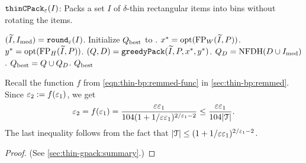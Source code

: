 \begin{algorithm}[htb]
\caption{$\operatorname{\mathtt{thinCPack}}_{\varepsilon}(I)$: Packs a set $I$ of $\delta$-thin rectangular items
into bins without rotating the items.}
\label{algo:thinCPack}
\begin{algorithmic}[1]
\State $(\widetilde{I}, I_{\mathrm{med}}) = \operatorname{\mathtt{round}}_{\varepsilon}(I)$.
\State Initialize $Q_{\mathrm{best}}$ to \Null.
    \State $x^* = \operatorname{opt}(\operatorname{FP}_W(\widetilde{I}, P))$.
    \State $y^* = \operatorname{opt}(\operatorname{FP}_H(\widetilde{I}, P))$.
        \State $(Q, D) = \operatorname{\mathtt{greedyPack}}(\widetilde{I}, P, x^*, y^*)$.
        \State $Q_D = \operatorname{NFDH}(D \cup I_{\mathrm{med}})$.
            \State $Q_{\mathrm{best}} = Q \cup Q_D$.
        \EndIf
    \EndIf
\EndFor
\State \Return $Q_{\mathrm{best}}$
\end{algorithmic}
\end{algorithm}

Recall the function $f$ from \cref{eqn:thin-bp:remmed-func} in \cref{sec:thin-bp:remmed}.
Since $\varepsilon_2 := f(\varepsilon_1)$, we get
\begin{equation}
\label{eqn:epsSmall}
\varepsilon_2 = f(\varepsilon_1)
= \frac{\varepsilon\varepsilon_1}{104(1+1/\varepsilon\varepsilon_1)^{2/\varepsilon_1-2}}
\le \frac{\varepsilon\varepsilon_1}{104|\mathcal{T}|}.
\end{equation}
The last inequality follows from the fact that
$|\mathcal{T}| \le (1+1/\varepsilon\varepsilon_1)^{2/\varepsilon_1-2}$.

\rthmNfdhWide*
\begin{proof}(See \cref{sec:thin-gpack:summary}.)\end{proof}

